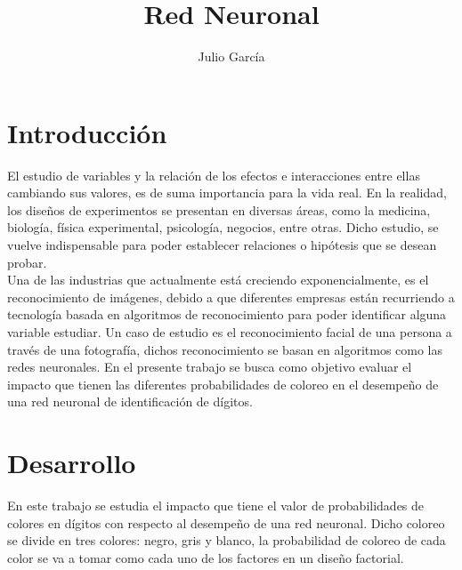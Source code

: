 \documentclass{article}
\title {Red Neuronal}
\author{Julio Garc\'ia}
\begin{document}
	\renewcommand{\listtablename}{Índice de tablas}
	\renewcommand{\tablename}{Cuadro}
	\maketitle
	
	\section{Introducción}
	El estudio de variables y la relación de los efectos e interacciones entre ellas cambiando sus valores, es de suma importancia para la vida real. En la realidad, los diseños de experimentos se presentan en diversas áreas, como la medicina, biología, física experimental, psicología, negocios, entre otras. Dicho estudio, se vuelve indispensable para poder establecer relaciones o hipótesis que se desean probar.\\
	Una de las industrias que actualmente está creciendo exponencialmente, es el reconocimiento de imágenes, debido a que diferentes empresas están recurriendo a tecnología basada en algoritmos de reconocimiento para poder identificar alguna variable estudiar. Un caso de estudio es el reconocimiento facial de una persona a través de una fotografía, dichos reconocimiento se basan en algoritmos como las redes neuronales. En el presente trabajo se busca como objetivo evaluar el impacto que tienen las diferentes probabilidades de coloreo en el desempeño de una red neuronal de identificación de dígitos. 

	
	\section{Desarrollo}
	En este trabajo se estudia el impacto que tiene el valor de probabilidades de colores en dígitos con respecto al desempeño de una red neuronal. Dicho coloreo se divide en tres colores: negro, gris y blanco, la probabilidad de coloreo de cada color se va a tomar como cada uno de los factores en un diseño factorial.\\
\end{document}
